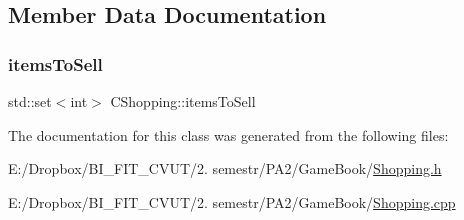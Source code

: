 \subsection{Member Data Documentation}
\mbox{\label{class_c_shopping_ac6f61d541ae75665fd5a6e2d360a0bfd}} 
\subsubsection{\texorpdfstring{items\+To\+Sell}{itemsToSell}}
{\footnotesize\ttfamily std\+::set$<$int$>$ C\+Shopping\+::items\+To\+Sell\hspace{0.3cm}{\ttfamily [protected]}}



The documentation for this class was generated from the following files\+:\begin{DoxyCompactItemize}
\item 
E\+:/\+Dropbox/\+B\+I\+\_\+\+F\+I\+T\+\_\+\+C\+V\+U\+T/2. semestr/\+P\+A2/\+Game\+Book/\mbox{\hyperlink{_shopping_8h}{Shopping.\+h}}\item 
E\+:/\+Dropbox/\+B\+I\+\_\+\+F\+I\+T\+\_\+\+C\+V\+U\+T/2. semestr/\+P\+A2/\+Game\+Book/\mbox{\hyperlink{_shopping_8cpp}{Shopping.\+cpp}}\end{DoxyCompactItemize}

